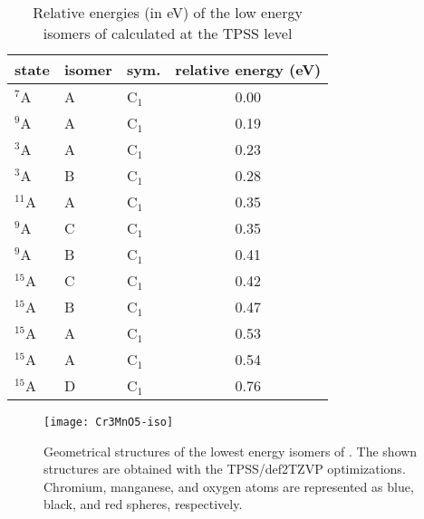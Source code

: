 \begin{table}[]
	\centering
	\caption{Relative energies (in eV) of the low energy isomers of  calculated at the TPSS level}
	\begin{tabular}{@{}lllc@{}}
	\toprule
	state & isomer & sym. & relative energy (eV) \\ \midrule
	$^7$A     & A      & C$_1$   & 0.00                 \\
	$^9$A     & A      & C$_1$   & 0.19                 \\
	$^3$A     & A      & C$_1$   & 0.23                 \\
	$^3$A     & B      & C$_1$   & 0.28                 \\
	$^{11}$A  & A      & C$_1$   & 0.35                 \\
	$^9$A     & C      & C$_1$   & 0.35                 \\
	$^9$A     & B      & C$_1$   & 0.41                 \\
	$^{15}$A  & C      & C$_1$   & 0.42                 \\
	$^{15}$A  & B      & C$_1$   & 0.47                 \\
	$^{15}$A  & A      & C$_1$   & 0.53                 \\
	$^{15}$A  & A      & C$_1$   & 0.54                 \\
	$^{15}$A  & D      & C$_1$   & 0.76                 \\ \bottomrule
	\end{tabular}
\end{table}




\begin{figure}
	\centering
	\texttt{[image: Cr3MnO5-iso]}
	\caption{Geometrical structures of the lowest energy isomers of . The shown structures are obtained with the TPSS/def2TZVP optimizations. Chromium, manganese, and oxygen atoms are represented as blue, black, and red spheres, respectively.}
	\label{figs:Cr3MnO5}
\end{figure}






